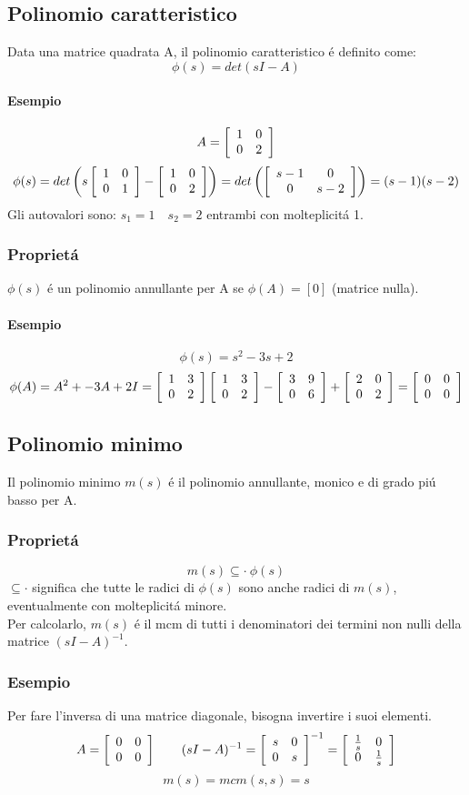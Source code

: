 \documentclass[../main.tex]{subfiles}
\begin{document}
	\subsection{Polinomio caratteristico}
	Data una matrice quadrata A, il polinomio caratteristico \'e definito come:
	\[ \phi(s) = det(sI - A) \]
	\paragraph{Esempio}
	\[ A = \left[ \begin{array}{cc} 1 & 0\\ 0 & 2 \end{array} \right] \]
	\[ \phi(s) = det \left( s \left[ \begin{array}{cc} 1 & 0\\ 0 & 1 \end{array} \right] - \left[ \begin{array}{cc} 1 & 0\\ 0 & 2 \end{array} \right] \right) = det \left( \left[ \begin{array}{cc} s-1 & 0\\ 0 & s-2 \end{array} \right] \right) = (s-1)(s-2) \]
	Gli autovalori sono: $ s_1 = 1 \quad s_2 = 2 $ entrambi con molteplicit\'a 1.
	\subsubsection{Propriet\'a}
	$ \phi(s) $ \'e un polinomio annullante per A se $ \phi(A) = [0] $ (matrice nulla).
	\paragraph{Esempio}
	\[ \phi(s) = s^2 - 3s + 2 \]
	\[ \phi(A) = A^2 + -3A + 2I = \left[ \begin{array}{cc} 1 & 3\\ 0 & 2 \end{array} \right] \left[ \begin{array}{cc} 1 & 3\\ 0 & 2 \end{array} \right] - \left[ \begin{array}{cc} 3 & 9\\ 0 & 6 \end{array} \right] + \left[ \begin{array}{cc} 2 & 0\\ 0 & 2 \end{array} \right] = \left[ \begin{array}{cc} 0 & 0\\ 0 & 0 \end{array} \right]\]
	\subsection{Polinomio minimo}
	Il polinomio minimo $ m(s) $ \'e il polinomio annullante, monico e di grado pi\'u basso per A.
	\subsubsection{Propriet\'a}
	\[ m(s) \subseteq \cdot\ \phi(s) \]
	$ \subseteq \cdot $ significa che tutte le radici di $ \phi(s) $ sono anche radici di $ m(s) $, eventualmente con molteplicit\'a minore.\\
	\linebreak
	Per calcolarlo, $ m(s) $ \'e il mcm di tutti i denominatori dei termini non nulli della matrice $ (sI - A)^{-1} $. 
	\subsubsection*{Esempio}
	Per fare l'inversa di una matrice diagonale, bisogna invertire i suoi elementi. 
	\[ A = \left[ \begin{array}{cc} 0 & 0\\ 0 & 0 \end{array} \right] \qquad (sI - A)^{-1} = \left[ \begin{array}{cc} s & 0\\ 0 & s \end{array} \right]^{-1} = \left[ \begin{array}{cc} \frac{1}{s} & 0\\ 0 & \frac{1}{s} \end{array} \right] \]
	\[ m(s) = mcm( s, s) = s \]
\end{document}
